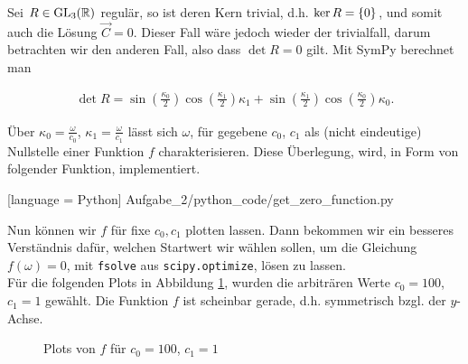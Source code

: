 Sei $R \in \GL[3]{\R}$ regulär, so ist deren Kern trivial, d.h. $\ker{R} = \Bbraces{0}$, und somit auch die Lösung $\vec C = 0$. Dieser Fall wäre jedoch wieder der trivialfall, darum betrachten wir den anderen Fall, also dass $\det{R} = 0$ gilt. Mit SymPy berechnet man

\begin{align*}
  \det{R} =
  \sin{\left(\frac{{\kappa}_{0}}{2} \right)} \cos{\left(\frac{{\kappa}_{1}}{2} \right)} {\kappa}_{1} + \sin{\left(\frac{{\kappa}_{1}}{2} \right)} \cos{\left(\frac{{\kappa}_{0}}{2} \right)} {\kappa}_{0}.
\end{align*}

Über $\kappa_0 = \frac{\omega}{c_0}$, $\kappa_1 = \frac{\omega}{c_1}$ lässt sich $\omega$, für gegebene $c_0$, $c_1$ als (nicht eindeutige) Nullstelle einer Funktion $f$ charakterisieren. Diese Überlegung, wird, in Form von folgender Funktion, implementiert.


[language = Python]
{Aufgabe_2/python_code/get_zero_function.py}

Nun können wir $f$ für fixe $c_0, c_1$ plotten lassen. Dann bekommen wir ein besseres Verständnis dafür, welchen Startwert wir wählen sollen, um die Gleichung $f(\omega) = 0$, mit \verb|fsolve| aus \verb|scipy.optimize|, lösen zu lassen. \\

Für die folgenden Plots in Abbildung \ref{fig:zero_function}, wurden die arbiträren Werte $c_0 = 100$, $c_1 = 1$ gewählt. Die Funktion $f$ ist scheinbar gerade, d.h. symmetrisch bzgl. der $y$-Achse.

\begin{figure}[h!]
  \centering
  \hspace{0mm}
  \caption{Plots von $f$ für $c_0 = 100$, $c_1 = 1$}
  \label{fig:zero_function}
\end{figure}


